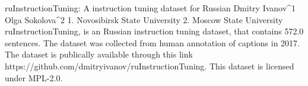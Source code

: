 
ruInstructionTuning: A instruction tuning dataset for Russian
Dmitry Ivanov^1 Olga Sokolova^2
1. Novosibirsk State University 2. Moscow State University
ruInstructionTuning, is an Russian instruction tuning dataset, that contains 572.0 sentences.
The dataset was collected from human annotation of captions in 2017. 
The dataset is publically available through this link https://github.com/dmitryivanov/ruInstructionTuning. This dataset is licensed under MPL-2.0.

